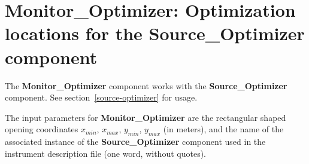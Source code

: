 
\section{Monitor\_Optimizer: Optimization locations for the
  Source\_Optimizer component}
\label{monitor-optimizer}

The {\bf Monitor\_Optimizer} component works with the {\bf
  Source\_Optimizer} component. See section~\ref{source-optimizer}
for usage.

The input parameters for {\bf Monitor\_Optimizer} are the rectangular
shaped opening coordinates $x_{min}$, $x_{max}$, $y_{min}$,
$y_{max}$ (in meters), and the name of the associated instance of
the {\bf
  Source\_Optimizer} component used in the instrument description file (one word,
without quotes).
